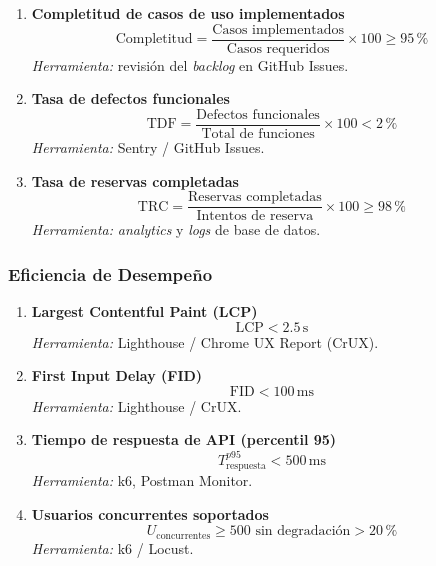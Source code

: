 \documentclass[12pt, a4paper]{article}
\begin{document}
\begin{enumerate}[leftmargin=*, label=\textbf{KPI \arabic*.}]

    \item \textbf{Completitud de casos de uso implementados}
    \[
        \text{Completitud} = \frac{\text{Casos implementados}}{\text{Casos requeridos}} \times 100 \geq 95\,\%
    \]
    \textit{Herramienta:} revisión del \textit{backlog} en GitHub Issues.

    \item \textbf{Tasa de defectos funcionales}
    \[
        \text{TDF} = \frac{\text{Defectos funcionales}}{\text{Total de funciones}} \times 100 < 2\,\%
    \]
    \textit{Herramienta:} Sentry / GitHub Issues.

    \item \textbf{Tasa de reservas completadas}
    \[
        \text{TRC} = \frac{\text{Reservas completadas}}{\text{Intentos de reserva}} \times 100 \geq 98\,\%
    \]
    \textit{Herramienta:} \textit{analytics} y \textit{logs} de base de datos.

\end{enumerate}

\subsubsection*{Eficiencia de Desempeño}

\begin{enumerate}[leftmargin=*, label=\textbf{KPI \arabic*.}, start=4]

    \item \textbf{Largest Contentful Paint (LCP)}
    \[
        \text{LCP} < 2.5\,\text{s}
    \]
    \textit{Herramienta:} Lighthouse / Chrome UX Report (CrUX).

    \item \textbf{First Input Delay (FID)}
    \[
        \text{FID} < 100\,\text{ms}
    \]
    \textit{Herramienta:} Lighthouse / CrUX.

    \item \textbf{Tiempo de respuesta de API (percentil 95)}
    \[
        T_{\text{respuesta}}^{p95} < 500\,\text{ms}
    \]
    \textit{Herramienta:} k6, Postman Monitor.

    \item \textbf{Usuarios concurrentes soportados}
    \[
        U_{\text{concurrentes}} \geq 500 \text{ sin degradación} > 20\,\%
    \]
    \textit{Herramienta:} k6 / Locust.

\end{enumerate}
\end{document}
